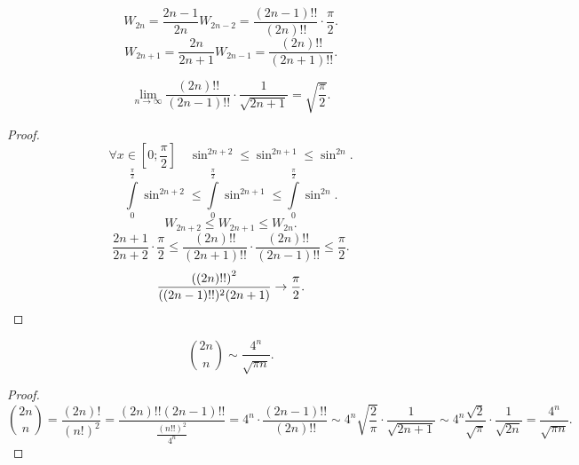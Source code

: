 \documentclass[11pt, oneside]{article}   	%
\begin{document}
\begin{dlemma}
    \[ W_{2n} = \frac{2n-1}{2n}W_{2n-2} = \frac{(2n-1)!!}{(2n)!!} \cdot  \frac{\pi}{2} .\]
    \[ W_{2n+1} = \frac{2n}{2n+1} W_{2n-1} = \frac{(2n)!!}{(2n+1)!!} .\] 
\end{dlemma}
\begin{dlemma}
    \[ \lim\limits_{n \to \infty} \frac{(2n)!!}{(2n-1)!!} \cdot \frac{1}{\sqrt{2n+1} } = \sqrt{\frac{\pi}{2}}  .\]
    \begin{proof}
        \[\forall{x\in \left[0; \frac{\pi}{2}\right]}\quad \sin^{2n+2} \le\sin^{2n+1} \le\sin^{2n} .\]
        \[ \int\limits_{0}^{\frac{\pi}{2}} \sin^{2n+2} \le \int\limits_{0}^{\frac{\pi}{2}} \sin^{2n+1} \le \int\limits_{0}^{\frac{\pi}{2}}\sin^{2n}       .\]
        \[ W_{2n+2} \le W_{2n+1} \le W_{2n}.\]
        \[ \frac{2n+1}{2n+2} \cdot  \frac{\pi}{2} \le \frac{(2n)!!}{(2n+1)!!} \cdot \frac{(2n)!!}{(2n-1)!!} \le \frac{\pi}{2} .\]
        \[ \frac{\left( (2n)!! \right)^{2}}{((2n-1)!!)^2(2n+1)} \to \frac{\pi}{2} .\qedhere\] 
    \end{proof}
\end{dlemma}
\begin{dlemma}
    \[ \binom{2n}{n} \sim \frac{4^{n}}{\sqrt{\pi n} }.\]
    \begin{proof}
        \[ \binom{2n}{n} = \frac{(2n)!}{(n!)^2} = \frac{(2n)!!(2n-1)!!}{\frac{(n!!)^2}{4^{n}}} = 4^{n} \cdot \frac{(2n-1)!!}{(2n)!!} \sim 4^{n} \sqrt{\frac{2}{\pi}}\cdot \frac{1}{\sqrt{2n+1} } \sim 4^{n} \frac{\sqrt{2} }{\sqrt{\pi} } \cdot \frac{1}{\sqrt{2n} } = \frac{4^{n}}{\sqrt{\pi n} }.\] 
    \end{proof}
\end{dlemma}
\end{document}
